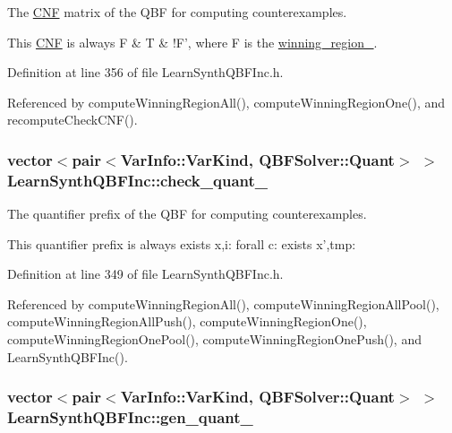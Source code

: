 The \hyperlink{classCNF}{C\-N\-F} matrix of the Q\-B\-F for computing counterexamples. 

This \hyperlink{classCNF}{C\-N\-F} is always F \& T \& !\-F', where F is the \hyperlink{classLearnSynthQBFInc_abc3503bdb6be7053a7c3d3d7e57858d6}{winning\-\_\-region\-\_\-}. 

Definition at line 356 of file Learn\-Synth\-Q\-B\-F\-Inc.\-h.



Referenced by compute\-Winning\-Region\-All(), compute\-Winning\-Region\-One(), and recompute\-Check\-C\-N\-F().

\hypertarget{classLearnSynthQBFInc_a1430ac66d026f9e3f30619082f378426}{
\subsubsection[{check\-\_\-quant\-\_\-}]{\setlength{\rightskip}{0pt plus 5cm}vector$<$pair$<${\bf Var\-Info\-::\-Var\-Kind}, {\bf Q\-B\-F\-Solver\-::\-Quant}$>$ $>$ Learn\-Synth\-Q\-B\-F\-Inc\-::check\-\_\-quant\-\_\-\hspace{0.3cm}{\ttfamily [protected]}}}\label{classLearnSynthQBFInc_a1430ac66d026f9e3f30619082f378426}


The quantifier prefix of the Q\-B\-F for computing counterexamples. 

This quantifier prefix is always exists x,i\-: forall c\-: exists x',tmp\-: 

Definition at line 349 of file Learn\-Synth\-Q\-B\-F\-Inc.\-h.



Referenced by compute\-Winning\-Region\-All(), compute\-Winning\-Region\-All\-Pool(), compute\-Winning\-Region\-All\-Push(), compute\-Winning\-Region\-One(), compute\-Winning\-Region\-One\-Pool(), compute\-Winning\-Region\-One\-Push(), and Learn\-Synth\-Q\-B\-F\-Inc().

\hypertarget{classLearnSynthQBFInc_af42c16902cfccdf51d1c1bc112be0ee4}{
\subsubsection[{gen\-\_\-quant\-\_\-}]{\setlength{\rightskip}{0pt plus 5cm}vector$<$pair$<${\bf Var\-Info\-::\-Var\-Kind}, {\bf Q\-B\-F\-Solver\-::\-Quant}$>$ $>$ Learn\-Synth\-Q\-B\-F\-Inc\-::gen\-\_\-quant\-\_\-\hspace{0.3cm}{\ttfamily [protected]}}}\label{classLearnSynthQBFInc_af42c16902cfccdf51d1c1bc112be0ee4}



